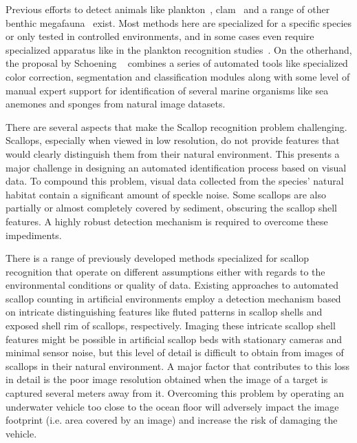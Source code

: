 \documentclass {udthesis}
\begin{document}
Previous efforts to detect animals like plankton~\cite{mcgavin_plankton, stelzer_rotifier}, clam~\cite{forrest_clam} and a range of other benthic megafauna~\cite{schoening} exist. Most methods here are specialized for a specific species or only tested in controlled environments, and in some cases even require specialized apparatus like in the plankton recognition studies~\cite{mcgavin_plankton, stelzer_rotifier}. On the otherhand, the proposal by Schoening ~\cite{schoening} combines a series of automated tools like specialized color correction, segmentation and classification modules along with some level of manual expert support for identification of several marine organisms like sea anemones and sponges from natural image datasets. 

There are several aspects that make the Scallop recognition problem challenging.
Scallops, especially when viewed in low resolution, do not provide features
that would clearly distinguish them from their natural environment.  This
presents a major challenge in designing an automated identification process 
based on visual data.  To compound this problem, visual data collected
from the species' natural habitat contain a
significant amount of speckle noise.
Some scallops are also partially or almost completely
covered by sediment, obscuring the scallop shell features.
A highly robust detection mechanism is required to overcome these impediments.

There is a range of previously developed methods specialized for scallop recognition 
\cite{dawkings13,guomundsson,enomoto9,enomoto10,fearn, prasanna_med, prasanna_aslo, prasanna_igi} 
that operate on different assumptions either with regards to the environmental conditions or quality of data.
Existing approaches to automated scallop counting in artificial environments
 \cite{enomoto9, enomoto10} employ a detection mechanism based on intricate distinguishing features 
like fluted patterns in scallop shells and exposed shell rim of scallops, respectively.
Imaging these intricate scallop shell features might
be possible in artificial scallop beds with stationary cameras and 
minimal sensor noise, but this level of detail 
is difficult to obtain from images of scallops in their natural environment. 
A major factor that contributes to this loss in detail
is the poor image resolution obtained when the image of a target
is captured several meters away from it. 
Overcoming this problem by operating an underwater vehicle too close to the ocean floor 
will adversely impact the image footprint (i.e. area covered by an image) and increase the risk of damaging the vehicle.
\end{document}
